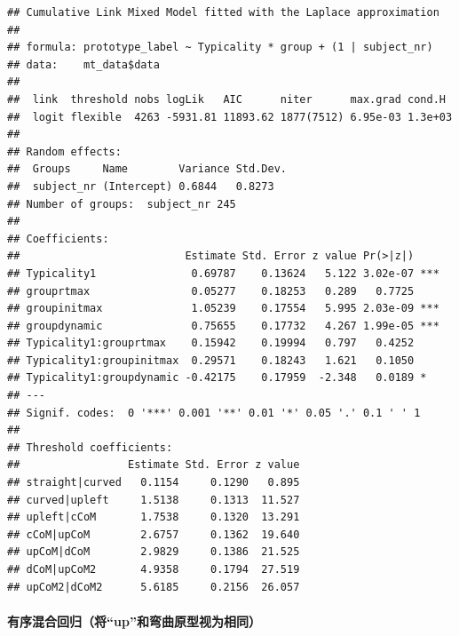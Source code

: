 \documentclass[
]{article}
\newenvironment{Shaded}{\begin{snugshade}}{\end{snugshade}}
\newcommand{\AttributeTok}[1]{\textcolor[rgb]{0.13,0.29,0.53}{#1}}
\newcommand{\DecValTok}[1]{\textcolor[rgb]{0.00,0.00,0.81}{#1}}
\newcommand{\FunctionTok}[1]{\textcolor[rgb]{0.13,0.29,0.53}{\textbf{#1}}}
\newcommand{\NormalTok}[1]{#1}
\newcommand{\SpecialCharTok}[1]{\textcolor[rgb]{0.81,0.36,0.00}{\textbf{#1}}}
\begin{document}
\begin{verbatim}
## Cumulative Link Mixed Model fitted with the Laplace approximation
## 
## formula: prototype_label ~ Typicality * group + (1 | subject_nr)
## data:    mt_data$data
## 
##  link  threshold nobs logLik   AIC      niter      max.grad cond.H 
##  logit flexible  4263 -5931.81 11893.62 1877(7512) 6.95e-03 1.3e+03
## 
## Random effects:
##  Groups     Name        Variance Std.Dev.
##  subject_nr (Intercept) 0.6844   0.8273  
## Number of groups:  subject_nr 245 
## 
## Coefficients:
##                          Estimate Std. Error z value Pr(>|z|)    
## Typicality1               0.69787    0.13624   5.122 3.02e-07 ***
## grouprtmax                0.05277    0.18253   0.289   0.7725    
## groupinitmax              1.05239    0.17554   5.995 2.03e-09 ***
## groupdynamic              0.75655    0.17732   4.267 1.99e-05 ***
## Typicality1:grouprtmax    0.15942    0.19994   0.797   0.4252    
## Typicality1:groupinitmax  0.29571    0.18243   1.621   0.1050    
## Typicality1:groupdynamic -0.42175    0.17959  -2.348   0.0189 *  
## ---
## Signif. codes:  0 '***' 0.001 '**' 0.01 '*' 0.05 '.' 0.1 ' ' 1
## 
## Threshold coefficients:
##                 Estimate Std. Error z value
## straight|curved   0.1154     0.1290   0.895
## curved|upleft     1.5138     0.1313  11.527
## upleft|cCoM       1.7538     0.1320  13.291
## cCoM|upCoM        2.6757     0.1362  19.640
## upCoM|dCoM        2.9829     0.1386  21.525
## dCoM|upCoM2       4.9358     0.1794  27.519
## upCoM2|dCoM2      5.6185     0.2156  26.057
\end{verbatim}

\paragraph{有序混合回归（将``up''和弯曲原型视为相同）}\label{ux6709ux5e8fux6df7ux5408ux56deux5f52ux5c06upux548cux5f2fux66f2ux539fux578bux89c6ux4e3aux76f8ux540c}

\begin{Shaded}
\end{Shaded}
\end{document}
